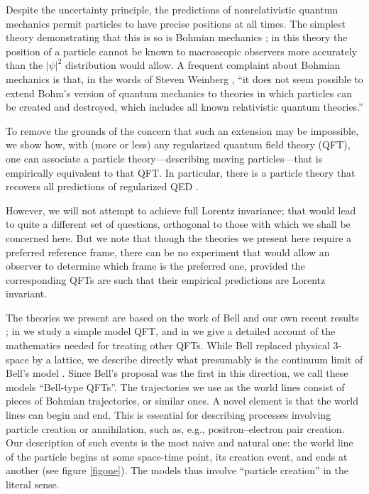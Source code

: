 \documentclass[prl, twocolumn, showpacs, superscriptaddress]{revtex4}%
\begin{document}
Despite the uncertainty principle, the predictions
of nonrelativistic quantum mechanics permit particles to have precise
positions at all times.  The simplest theory demonstrating that this
is so is Bohmian mechanics \cite{Bohm52,Ischia,Stanford}; in this
theory the position of a particle cannot be known to macroscopic
observers more accurately than the $|\psi|^2$ distribution would
allow.  A frequent complaint about Bohmian mechanics is that, in the
words of Steven Weinberg \cite{weinlet}, ``it does not seem possible
to extend Bohm's version of quantum mechanics to theories in which
particles can be created and destroyed, which includes all known
relativistic quantum theories.''

To remove the grounds of the concern that such an extension may be
impossible, we show how, with (more or less) any regularized quantum
field theory (QFT), one can associate a particle theory---describing
moving particles---that is empirically equivalent to that QFT. In
particular, there is a particle theory that recovers all predictions
of regularized QED \cite{footn1}.

However, we will not attempt to achieve full Lorentz invariance; that
would lead to quite a different set of questions, orthogonal to those
with which we shall be concerned here. But we note that though the
theories we present here require a preferred reference frame, there
can be no experiment that would allow an observer to determine which
frame is the preferred one, provided the corresponding QFTs are such
that their empirical predictions are Lorentz invariant.

The theories we present are based on the work of Bell
\cite{BellBeables} and our own recent results
\cite{crea1,crea2a,crea2b}; in \cite{crea1} we study a simple model
QFT, and in \cite{crea2a,crea2b} we give a detailed account of the
mathematics needed for treating other QFTs.  While Bell replaced
physical 3-space by a lattice, we describe directly what presumably is
the continuum limit of Bell's model \cite{crea2a,crea2b,Sudbery,Vink}.
Since Bell's proposal was the first in this direction, we call these
models ``Bell-type QFTs''.  The trajectories we use as the world lines
consist of pieces of Bohmian trajectories, or similar ones.  A novel
element is that the world lines can begin and end.  This is essential
for describing processes involving particle creation or annihilation,
such as, e.g., positron--electron pair creation.  Our description of
such events is the most naive and natural one: the world line of the
particle begins at some space-time point, its creation event, and ends
at another (see figure \ref{figone}).  The models thus involve
``particle creation'' in the literal sense.
\end{document}
